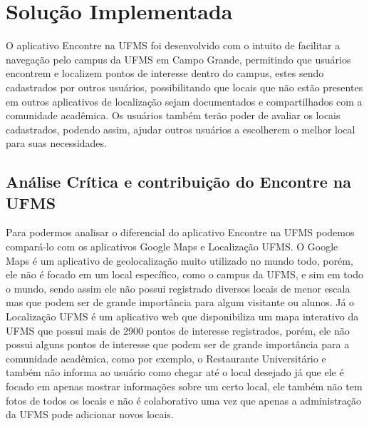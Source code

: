 \section{Solução Implementada}

    O aplicativo Encontre na UFMS foi desenvolvido com o intuito de facilitar a navegação pelo campus da UFMS em Campo Grande, permitindo que usuários encontrem e localizem pontos de interesse dentro do campus, estes sendo cadastrados por outros usuários, possibilitando que locais que não estão presentes em outros aplicativos de localização sejam documentados e compartilhados com a comunidade acadêmica. Os usuários também terão poder de avaliar os locais cadastrados, podendo assim, ajudar outros usuários a escolherem o melhor local para suas necessidades.

\subsection{Análise Crítica e contribuição do Encontre na UFMS}
    Para podermos analisar o diferencial do aplicativo Encontre na UFMS podemos compará-lo com os aplicativos Google Maps e Localização UFMS. O Google Maps é um aplicativo de geolocalização muito utilizado no mundo todo, porém, ele não é focado em um local específico, como o campus da UFMS, e sim em todo o mundo, sendo assim ele não possui registrado diversos locais de menor escala mas que podem ser de grande importância para algum visitante ou alunos. Já o Localização UFMS é um aplicativo web que disponibiliza um mapa interativo da UFMS que possui mais de 2900 pontos de interesse registrados, porém, ele não possui alguns pontos de interesse que podem ser de grande importância para a comunidade acadêmica, como por exemplo, o Restaurante Universitário e também não informa ao usuário como chegar até o local desejado já que ele é focado em apenas mostrar informações sobre um certo local, ele também não tem fotos de todos os locais e não é colaborativo uma vez que apenas a administração da UFMS pode adicionar novos locais.

